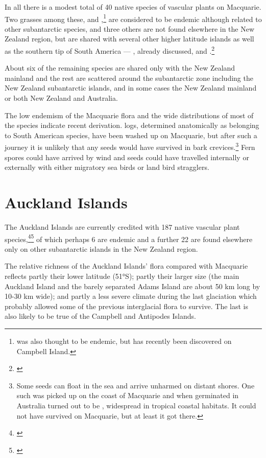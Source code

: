 In all there is a modest total of 40 native species of vascular plants on Macquarie.
Two grasses among these,  and ,\footnote{ was also thought to be endemic, but has recently been discovered on Campbell Island.} are considered to be endemic although related to other subantarctic species, and three others are not found elsewhere in the New Zealand region, but are shared with several other higher latitude islands as well as the southern tip of South America — , already discussed,  and .\footnote{\cite{wace1960botany}}

About six of the remaining species are shared only with the New Zealand mainland and the rest are scattered around the subantarctic zone including the New Zealand subantarctic islands, and in some cases the New Zealand mainland or both New Zealand and Australia.

The low endemism of the Macquarie flora and the wide distributions of most of the species indicate recent derivation.  logs, determined anatomically as belonging to South American species, have been washed up on Macquarie, but after such a journey it is unlikely that any seeds would have survived in bark crevices.\footnote{Some seeds can float in the sea and arrive unharmed on distant shores. One such was picked up on the coast of Macquarie and when germinated in Australia turned out to be , widespread in tropical coastal habitats. It could not have survived on Macquarie, but at least it got there.}
Fern spores could have arrived by wind and seeds could have travelled internally or externally with either migratory sea birds or land bird stragglers.

\section{Auckland Islands}

The Auckland Islands are currently credited with 187 native vascular plant species,\footnote{\cite{meurk1982supplementary}}\footnote{\cite{johnson1975vascular}} of which perhaps 6 are endemic and a further 22 are found elsewhere only on other subantarctic islands in the New Zealand region.

The relative richness of the Auckland Islands' flora compared with Macquarie reflects partly their lower latitude (51°S); partly their larger size (the main Auckland Island and the barely separated Adams Island are about 50 km long by 10-30 km wide); and partly a less severe climate during the last glaciation which probably allowed some of the previous interglacial flora to survive.
The last is also likely to be true of the Campbell and Antipodes Islands.

